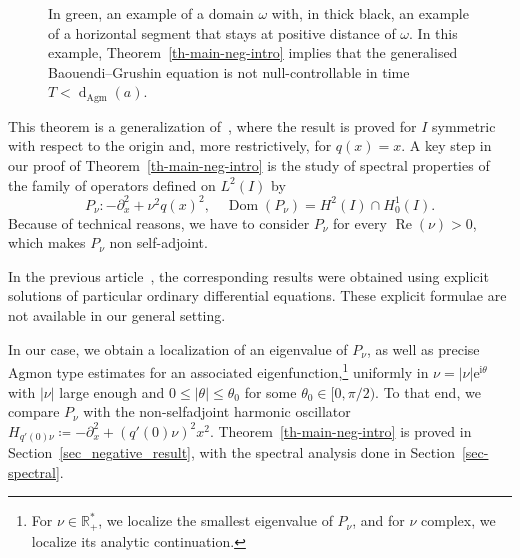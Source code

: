 \documentclass[AHL,Unicode,longabstracts,published]{cedram}
\renewcommand{\leq}{\leqslant}
\newcommand{\1}{\mathds 1}
\DeclareMathOperator{\Ree}{Re}
\DeclareMathOperator{\Dom}{Dom}
\newcommand{\dagmon}{\mathop{\mathrm{d}}\nolimits_{\mathrm{Agm}}}
\newcommand{\R}{\mathbb{R}}
\newcommand{\eu}{\mathrm e}
\newcommand{\iu}{\mathrm i}
\renewcommand{\th}{\theta}
\renewcommand{\o}{\omega}
\renewcommand{\o}{\omega}
\DeclareMathOperator{\Ree}{Re}
\begin{document}
\begin{figure}[ht]
\centering
{}
\caption{In green, an example of a domain $\omega$ with, in thick black, an example of a horizontal segment that stays at positive distance of $\o$. In this example, Theorem~\ref{th-main-neg-intro} implies that the generalised Baouendi--Grushin equation is not null-controllable in time $T<\dagmon(a)$.}\label{fig:omega_neg_intro}
\end{figure}

This theorem is a generalization of~\cite[Theorem~3.3]{DK20}, where the result is proved for $I$ symmetric with respect to the origin and, more restrictively, for $q(x) = x$. A key step in our proof of Theorem~\ref{th-main-neg-intro} is the study of spectral properties of the family of operators defined on $L^2(I)$ by
\begin{equation}\label{eq_def_Pnu}
P_\nu\colon -\partial^2_x + \nu^2 q(x)^2, \quad \Dom(P_\nu) = H^2(I)\cap H^1_0(I).
\end{equation}
Because of technical reasons, we have to consider $P_\nu$ for every $\Ree(\nu)>0$, which makes $P_\nu$ non self-adjoint.

In the previous article~\cite{DK20}, the corresponding results were obtained using explicit solutions of particular ordinary differential equations. These explicit formulae are not available in our general setting.

In our case, we obtain a localization of an eigenvalue of $P_\nu$, as well as precise Agmon type estimates for an associated eigenfunction,\footnote{For $\nu \in \R_+^*$, we localize the smallest eigenvalue of $P_\nu$, and for $\nu$ complex, we localize its analytic continuation.} uniformly in $\nu = \vert \nu \vert \eu^{\iu \theta}$ with $\vert \nu \vert$ large enough and $0 \leq \vert \theta \vert \leq \theta_0$ for some $\th_0 \in [0, {\pi}/{2})$. To that end, we compare $P_\nu$ with the non-selfadjoint harmonic oscillator $H_{q'(0)\nu}\coloneqq -\partial_x^2 + (q'(0)\nu)^2 x^2$. Theorem~\ref{th-main-neg-intro} is proved in Section~\ref{sec_negative_result}, with the spectral analysis done in Section~\ref{sec-spectral}.
\end{document}
